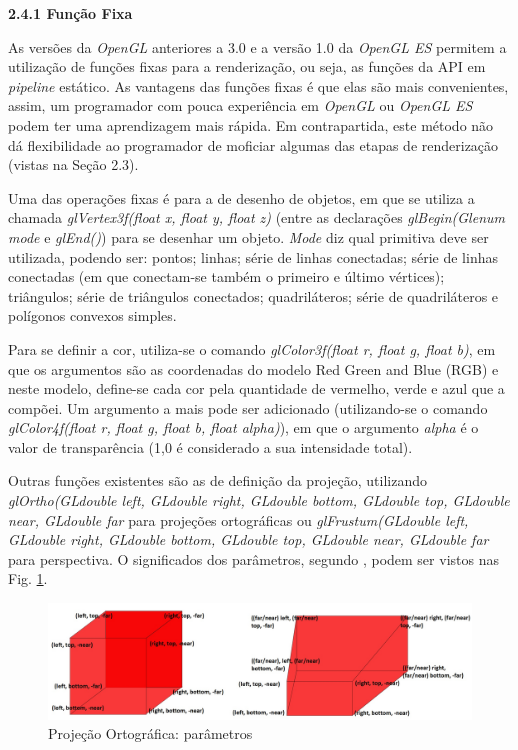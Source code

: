 \begin{description}	
	\item \textbf{2.4.1 Função Fixa}

	As versões da \textit{OpenGL} anteriores a 3.0  e a versão 1.0 da \textit{OpenGL ES} permitem a utilização de funções fixas para a renderização, ou seja, as funções da API em \textit{pipeline} estático. As vantagens das funções fixas é que elas são mais convenientes, assim, um programador com pouca experiência em  \textit{OpenGL} ou \textit{OpenGL ES} podem ter uma aprendizagem mais rápida. Em contrapartida, este método não dá flexibilidade ao programador de moficiar algumas das etapas de renderização (vistas na Seção 2.3). 

	 Uma das operações fixas é para a de desenho de objetos, em que se utiliza a chamada \textit{glVertex3f(float x, float y, float z)} (entre as declarações \textit{glBegin(Glenum mode} e \textit{glEnd()}) para se desenhar um objeto. \textit{Mode} diz qual primitiva deve ser utilizada, podendo ser: pontos; linhas; série de linhas conectadas; série de linhas conectadas (em que conectam-se também o primeiro e último vértices); triângulos; série de triângulos conectados; quadriláteros; série de quadriláteros e polígonos convexos simples. 

	Para se definir a cor, utiliza-se o  comando \textit{glColor3f(float r, float g, float b)}, em que os argumentos são as coordenadas do modelo Red Green and Blue (RGB) e neste modelo, define-se cada cor pela quantidade de vermelho, verde e azul que a compõei. Um argumento a mais pode ser adicionado (utilizando-se o comando \textit{glColor4f(float r, float g, float b, float alpha)}), em que o argumento \textit{alpha} é o valor de transparência (1,0 é considerado a sua intensidade total).  

	Outras funções existentes são as de definição da projeção, utilizando \textit{glOrtho(GLdouble left, GLdouble right, GLdouble bottom, GLdouble top, GLdouble near, GLdouble far} para projeções ortográficas ou \textit{glFrustum(GLdouble left, GLdouble right, GLdouble bottom, GLdouble top, GLdouble near, GLdouble far} para perspectiva. O significados dos parâmetros, segundo \cite{guha2011}, podem ser vistos nas  Fig. \ref{ortopers}.


 	\begin{figure}[h]
	\centering
		\includegraphics[keepaspectratio=true,scale=0.35]{figuras/ortopers.jpg}
	\caption{Projeção Ortográfica: parâmetros}
	\label{ortopers}
	\end{figure}


\end{description}
